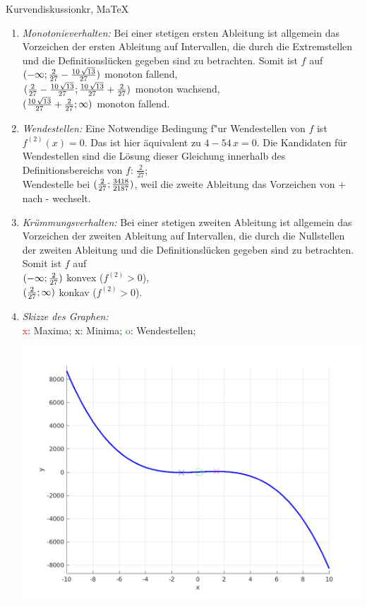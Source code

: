 \begin{MAufgabe}{Kurvendiskussion}{kr, MaTeX}
\begin{enumerate}
 \item \emph{Monotonieverhalten:} 
 Bei einer stetigen ersten Ableitung ist allgemein das Vorzeichen der ersten Ableitung auf Intervallen, die durch die Extremstellen und die Definitionsl\"ucken gegeben sind zu betrachten. Somit ist $f$ auf \\ 
 $(-\infty;\frac{2}{27} - \frac{10\, \sqrt{13}}{27})$ monoton fallend, \\ 
 $(\frac{2}{27} - \frac{10\, \sqrt{13}}{27};\frac{10\, \sqrt{13}}{27} + \frac{2}{27})$ monoton  wachsend, \\ 
 $(\frac{10\, \sqrt{13}}{27} + \frac{2}{27}; \infty)$ monoton fallend. \\ 
 \item \emph{Wendestellen:} 
 Eine Notwendige Bedingung f"ur Wendestellen von $f$ ist $f^{(2)}(x)=0$. 
 Das ist hier \"aquivalent zu $4 - 54\, x=0$. 
 Die Kandidaten f\"ur Wendestellen sind die L\"osung dieser Gleichung innerhalb des Definitionsbereichs von $f$: $\frac{2}{27}$; \\ 
 Wendestelle bei $(\frac{2}{27};\frac{3418}{2187})$, weil die zweite Ableitung das Vorzeichen von + nach - wechselt. \\ 
 \item \emph{Kr\"ummungsverhalten:} 
 Bei einer stetigen zweiten Ableitung ist allgemein das Vorzeichen der zweiten Ableitung auf Intervallen, die durch die Nullstellen der zweiten Ableitung und die Definitionsl\"ucken gegeben sind zu betrachten. 
 Somit ist $f$ auf \\ 
 $(-\infty ;\frac{2}{27})$  konvex ($f^{(2)}>0$), \\ 
 $(\frac{2}{27}; \infty)$  konkav ($f^{(2)}>0$). \\ 
 \item \emph{Skizze des Graphen:} \\ 
 {\textcolor{red} x}: Maxima; {\textcolor{black} x}: Minima; {\textcolor{green} o}: Wendestellen; 
  \begin{center}
  \includegraphics[width=0.8\linewidth]{Abb_zur_Ag_autogenerated_fractions_10.png} \end{center}
  
 \end{enumerate}
 \else\relax\fi
  \end{MAufgabe}